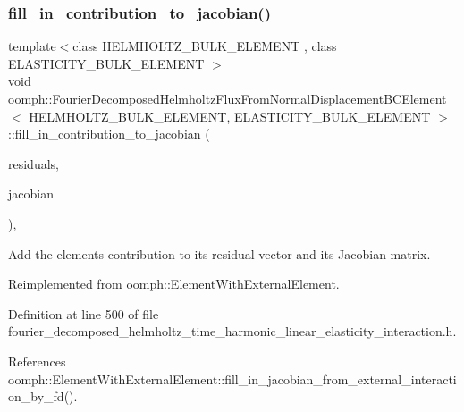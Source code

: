 \subsubsection{\texorpdfstring{fill\+\_\+in\+\_\+contribution\+\_\+to\+\_\+jacobian()}{fill\_in\_contribution\_to\_jacobian()}}
{\footnotesize\ttfamily template$<$class H\+E\+L\+M\+H\+O\+L\+T\+Z\+\_\+\+B\+U\+L\+K\+\_\+\+E\+L\+E\+M\+E\+NT , class E\+L\+A\+S\+T\+I\+C\+I\+T\+Y\+\_\+\+B\+U\+L\+K\+\_\+\+E\+L\+E\+M\+E\+NT $>$ \\
void \hyperlink{classoomph_1_1FourierDecomposedHelmholtzFluxFromNormalDisplacementBCElement}{oomph\+::\+Fourier\+Decomposed\+Helmholtz\+Flux\+From\+Normal\+Displacement\+B\+C\+Element}$<$ H\+E\+L\+M\+H\+O\+L\+T\+Z\+\_\+\+B\+U\+L\+K\+\_\+\+E\+L\+E\+M\+E\+NT, E\+L\+A\+S\+T\+I\+C\+I\+T\+Y\+\_\+\+B\+U\+L\+K\+\_\+\+E\+L\+E\+M\+E\+NT $>$\+::fill\+\_\+in\+\_\+contribution\+\_\+to\+\_\+jacobian (\begin{DoxyParamCaption}\item[{\hyperlink{classoomph_1_1Vector}{Vector}$<$ double $>$ \&}]{residuals,  }\item[{\hyperlink{classoomph_1_1DenseMatrix}{Dense\+Matrix}$<$ double $>$ \&}]{jacobian }\end{DoxyParamCaption})\hspace{0.3cm}{\ttfamily [inline]}, {\ttfamily [virtual]}}



Add the element\textquotesingle{}s contribution to its residual vector and its Jacobian matrix. 



Reimplemented from \hyperlink{classoomph_1_1ElementWithExternalElement_ae5fb09552a8271e891438f8d058ca1b8}{oomph\+::\+Element\+With\+External\+Element}.



Definition at line 500 of file fourier\+\_\+decomposed\+\_\+helmholtz\+\_\+time\+\_\+harmonic\+\_\+linear\+\_\+elasticity\+\_\+interaction.\+h.



References oomph\+::\+Element\+With\+External\+Element\+::fill\+\_\+in\+\_\+jacobian\+\_\+from\+\_\+external\+\_\+interaction\+\_\+by\+\_\+fd().

\mbox{\label{classoomph_1_1FourierDecomposedHelmholtzFluxFromNormalDisplacementBCElement_a9fb0fe9492372a7687b6e30b00d257c1}} 

